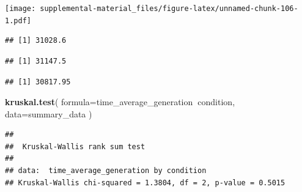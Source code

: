 \documentclass[]{book}
\newenvironment{Shaded}{\begin{snugshade}}{\end{snugshade}}
\newcommand{\DataTypeTok}[1]{\textcolor[rgb]{0.13,0.29,0.53}{#1}}
\newcommand{\KeywordTok}[1]{\textcolor[rgb]{0.13,0.29,0.53}{\textbf{#1}}}
\newcommand{\NormalTok}[1]{#1}
\newcommand{\OperatorTok}[1]{\textcolor[rgb]{0.81,0.36,0.00}{\textbf{#1}}}
\newcommand{\StringTok}[1]{\textcolor[rgb]{0.31,0.60,0.02}{#1}}
\begin{document}
\texttt{[image: supplemental-material\_files/figure-latex/unnamed-chunk-106-1.pdf]}

\begin{Shaded}
\end{Shaded}

\begin{verbatim}
## [1] 31028.6
\end{verbatim}

\begin{Shaded}
\end{Shaded}

\begin{verbatim}
## [1] 31147.5
\end{verbatim}

\begin{Shaded}
\end{Shaded}

\begin{verbatim}
## [1] 30817.95
\end{verbatim}

\begin{Shaded}
\begin{Highlighting}[]
\KeywordTok{kruskal.test}\NormalTok{(}
  \DataTypeTok{formula=}\NormalTok{time_average_generation}\OperatorTok{~}\NormalTok{condition,}
  \DataTypeTok{data=}\NormalTok{summary_data}
\NormalTok{)}
\end{Highlighting}
\end{Shaded}

\begin{verbatim}
## 
##  Kruskal-Wallis rank sum test
## 
## data:  time_average_generation by condition
## Kruskal-Wallis chi-squared = 1.3804, df = 2, p-value = 0.5015
\end{verbatim}
\end{document}
